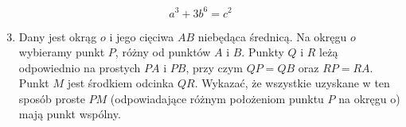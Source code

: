 \documentclass[10pt]{article}
\begin{document}
\[
a^{3}+3 b^{6}=c^{2}
\]

\begin{enumerate}
  \setcounter{enumi}{2}
  \item Dany jest okrąg \(o\) i jego cięciwa \(A B\) niebędąca średnicą. Na okręgu \(o\) wybieramy punkt \(P\), różny od punktów \(A\) i \(B\). Punkty \(Q\) i \(R\) leżą odpowiednio na prostych \(P A\) i \(P B\), przy czym \(Q P=Q B\) oraz \(R P=R A\). Punkt \(M\) jest środkiem odcinka \(Q R\). Wykazać, że wszystkie uzyskane w ten sposób proste \(P M\) (odpowiadające różnym położeniom punktu \(P\) na okręgu o) mają punkt wspólny.
\end{enumerate}
\end{document}
